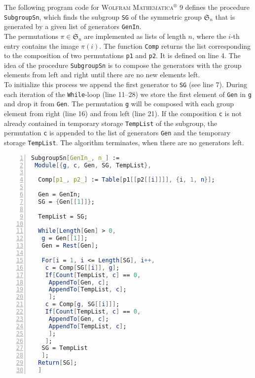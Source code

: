 The following program code for \textsc{Wolfram Mathematica$^\circledR$ 9} defines the procedure \verb+SubgroupSn+, which finds the subgroup \verb+SG+ of the symmetric group $\mathfrak{S}_n$ that is generated by a given list of generators \verb+GenIn+.\\
The permutations $\pi\in\mathfrak{S}_n$ are implemented as lists of length $n$, where the $i$-th entry contains the image $\pi(i)$. The function \verb+Comp+ returns the list corresponding to the composition of two permutations \verb+p1+ and \verb+p2+. It is defined on line 4. The idea of the procedure \verb+SubgroupSn+ is to compose the generators with the group elements from left and right until there are no new elements left.\\
To initialize this process we append the first generator to \verb+SG+ (see line 7). During each iteration of the \verb+While+-loop (line 11--28) we store the first element of \verb+Gen+ in \verb+g+ and drop it from \verb+Gen+. The permutation \verb+g+ will be composed with each group element from right (line 16) and from left (line 21). If the composition \verb+c+ is not already contained in temporary storage \verb+TempList+ of the subgroup, the permutation \verb+c+ is appended to the list of generators \verb+Gen+ and the temporary storage \verb+TempList+. The algorithm terminates, when there are no generators left.

\begin{lstlisting}[language=Mathematica, numbers=left, numberstyle=\tiny, stepnumber=2, numbersep=5pt]
SubgroupSn[GenIn_, n_] :=
 Module[{g, c, Gen, SG, TempList},
  
  Comp[p1_, p2_] := Table[p1[[p2[[i]]]], {i, 1, n}];
  
  Gen = GenIn;
  SG = {Gen[[1]]};
  
  TempList = SG;
  
  While[Length[Gen] > 0,
   g = Gen[[1]];
   Gen = Rest[Gen];
   
   For[i = 1, i <= Length[SG], i++,
    c = Comp[SG[[i]], g];
    If[Count[TempList, c] == 0,
     AppendTo[Gen, c];
     AppendTo[TempList, c];
     ];
    c = Comp[g, SG[[i]]];
    If[Count[TempList, c] == 0,
     AppendTo[Gen, c];
     AppendTo[TempList, c];
     ];
    ];
   SG = TempList
   ];
  Return[SG];
  ]
\end{lstlisting}

